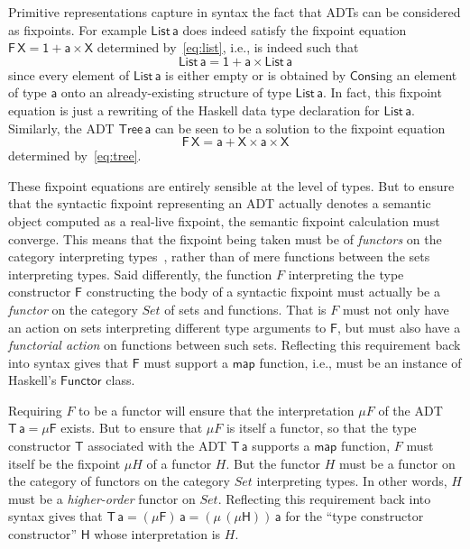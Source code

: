 \documentclass[acmsmall,screen,review,anonymous]{acmart}
\theoremstyle{definition}
\begin{document}
Primitive representations capture in syntax the fact that ADTs can be
considered as fixpoints. For example $\mathsf{List\,a}$ does indeed
satisfy the fixpoint equation $\mathsf{F\,X} = \mathsf{1 + a \times
  X}$ determined by~\eqref{eq:list}, i.e., is indeed such that
\[\mathsf{List\,a} = \mathsf{1 + a \times List\,a}\] 
since every element of $\mathsf{List\,a}$ is either empty or is
obtained by $\mathsf{Cons}$ing an element of type $\mathsf{a}$ onto an
already-existing structure of type $\mathsf{List\,a}$. In fact, this
fixpoint equation is just a rewriting of the Haskell data type
declaration for $\mathsf{List\,a}$. Similarly, the ADT
$\mathsf{Tree\,a}$ can be seen to be a solution to the fixpoint
equation
\[\mathsf{F\,X} = \mathsf{a + X \times a \times X}\] 
determined by~\eqref{eq:tree}.

These fixpoint equations are entirely sensible at the level of
types. But to ensure that the syntactic fixpoint representing an ADT
actually denotes a semantic object computed as a real-live fixpoint,
the semantic fixpoint calculation must converge. This means that the
fixpoint being taken must be of {\em functors} on the category
interpreting types~\cite{tfca}, rather than of mere functions between
the sets interpreting types. Said differently, the function $F$
interpreting the type constructor $\mathsf{F}$ constructing the body
of a syntactic fixpoint must actually be a {\em functor} on the
category $\mathit{Set}$ of sets and functions. That is $F$ must not
only have an action on sets interpreting different type arguments to
$\mathsf{F}$, but must also have a {\em functorial action} on
functions between such sets. Reflecting this requirement back into
syntax gives that $\mathsf{F}$ must support a $\mathsf{map}$ function,
i.e., must be an instance of Haskell's $\mathsf{Functor}$ class.

Requiring $F$ to be a functor will ensure that the interpretation $\mu
F$ of the ADT $\mathsf{T\,a} = \mathsf{\mu F}$ exists. But to ensure
that $\mu F$ is itself a functor, so that the type constructor
$\mathsf{T}$ associated with the ADT $\mathsf{T\,a}$ supports a
$\mathsf{map}$ function, $F$ must itself be the fixpoint $\mu H$ of a
functor $H$. But the functor $H$ must be a functor on the category of
functors on the category $\mathit{Set}$ interpreting types. In other
words, $H$ must be a {\em higher-order} functor on
$\mathit{Set}$. Reflecting this requirement back into syntax gives
that $\mathsf{T\,a} = \mathsf{(\mu F)\,a} = \mathsf{(\mu\,(\mu
  H))\,a}$ for the ``type constructor constructor'' $\mathsf{H}$ whose
interpretation is $H$.
\end{document}
